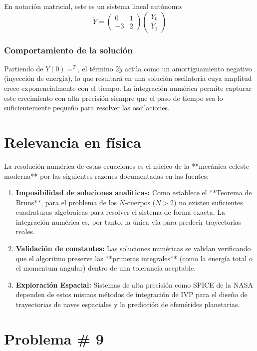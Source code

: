 \documentclass[a4paper]{article}
\begin{document}
En notación matricial, este es un sistema lineal autónomo:
$$ \dot{Y} = \begin{pmatrix} 0 & 1 \\ -3 & 2 \end{pmatrix} \begin{pmatrix} Y_0 \\ Y_1 \end{pmatrix} $$

\subsubsection{Comportamiento de la solución}
Partiendo de $ Y(0) =^T $, el término $ 2\dot{y} $ actúa como un amortiguamiento negativo (inyección de energía), lo que resultará en una solución oscilatoria cuya amplitud crece exponencialmente con el tiempo. La integración numérica permite capturar este crecimiento con alta precisión siempre que el paso de tiempo sea lo suficientemente pequeño para resolver las oscilaciones.

\section*{Relevancia en física}

La resolución numérica de estas ecuaciones es el núcleo de la **mecánica celeste moderna** por las siguientes razones documentadas en las fuentes:

\begin{enumerate}
    \item \textbf{Imposibilidad de soluciones analíticas:} Como establece el **Teorema de Bruns**, para el problema de los $ N $-cuerpos ($ N > 2 $) no existen suficientes cuadraturas algebraicas para resolver el sistema de forma exacta. La integración numérica es, por tanto, la única vía para predecir trayectorias reales.
    \item \textbf{Validación de constantes:} Las soluciones numéricas se validan verificando que el algoritmo preserve las **primeras integrales** (como la energía total o el momentum angular) dentro de una tolerancia aceptable.
    \item \textbf{Exploración Espacial:} Sistemas de alta precisión como SPICE de la NASA dependen de estos mismos métodos de integración de IVP para el diseño de trayectorias de naves espaciales y la predicción de efemérides planetarias.
\end{enumerate}


\section{Problema \# 9}
\end{document}
